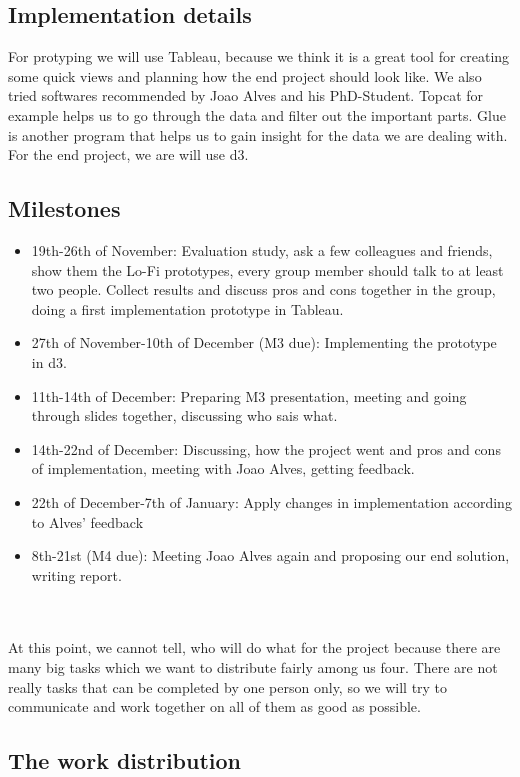\documentclass{article}
\begin{document}
\subsection {Implementation details}
For protyping we will use Tableau, because we think it is a great tool for creating some quick views and planning how the end project should look like. We also tried softwares recommended by Joao Alves and his PhD-Student. Topcat for example helps us to go through the data and filter out the important parts. Glue is another program that helps us to gain insight for the data we are dealing with. \\
For the end project, we are will use d3.

\subsection {Milestones}
\begin{itemize}

\item 19th-26th of November: Evaluation study, ask a few colleagues and 		friends, show them the Lo-Fi prototypes, every group member should 	talk to at least two people. Collect results and discuss pros and 		cons together in the group, doing a first implementation prototype 	in Tableau.
\item 	27th of November-10th of December (M3 due): Implementing 	the prototype in d3.
\item 	11th-14th of December: Preparing M3 presentation, meeting and going 		through slides together, discussing who sais what.
\item 	14th-22nd of December: Discussing, how the project went and pros and 	cons of implementation, meeting with Joao Alves, getting feedback.
\item 	22th of December-7th of January: Apply changes in 		implementation according to Alves' feedback
\item 	8th-21st (M4 due): Meeting Joao Alves again and proposing our end 	solution, writing report.
\end{itemize}
\\ \\
At this point, we cannot tell, who will do what for the project because there are many big tasks which we want to distribute fairly among us four. There are not really tasks that can be completed by one person only, so we will try to communicate and work together on all of them as good as possible.

\subsection {The work distribution}
\end{document}
